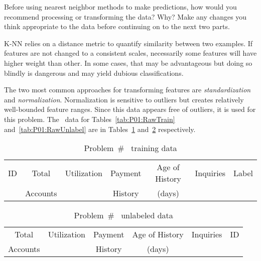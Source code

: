 \begin{subproblem}
  Before using nearest neighbor methods to make predictions, how would you recommend processing or transforming the data? Why? Make any changes you think appropriate to the data before continuing on to the next two parts.
\end{subproblem}

K-NN relies on a distance metric to quantify similarity between two examples.  If features are not changed to a consistent scales, necessarily some features will have higher weight than other.  In some cases, that may be advantageous but doing so blindly is dangerous and may yield dubious classifications.

The two most common approaches for transforming features are \textit{standardization} and \textit{normalization}.  Normalization is sensitive to outliers but creates relatively well-bounded feature ranges.  Since this data appears free of outliers, it is used for this problem. The \featureOp\ data for Tables~\ref{tab:P01:RawTrain} and~\ref{tab:P01:RawUnlabel} are in Tables~\ref{tab:P01:NormalTrain} and~\ref{tab:P01:NormalUnlabel} respectively.

\begin{table}[ht]
  \centering
  \caption{Problem~\# \featureOp\ training data}\label{tab:P01:NormalTrain}
  \begin{tabular}{|c||c|c|c|c|c|c|}
    \hline
    ID & Total    & Utilization & Payment & Age of History & Inquiries & Label \\
       & Accounts &             & History & (days)         &           & \\\hline\hline
    
  \end{tabular}
\end{table}

\begin{table}[ht]
  \centering
  \caption{Problem~\# \featureOp\ unlabeled data}\label{tab:P01:NormalUnlabel}
  \begin{tabular}{|c|c|c|c|c||c|}
    \hline
    Total    & Utilization & Payment & Age of History & Inquiries & ID \\
    Accounts &             & History & (days)         &           & \\\hline\hline
    
  \end{tabular}
\end{table}

